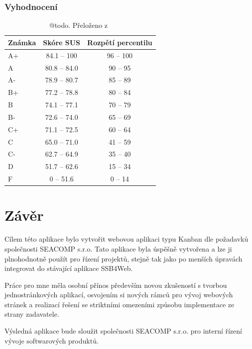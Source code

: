 \subsection{Vyhodnocení}

\begin{table}[hbt]
\centering
\caption{@todo. Přeloženo z~\cite{bib:sus-statistics}}
\begin{tabular}{|l|c|c|}
\hline
Známka & Skóre SUS  & Rozpětí percentilu  \\
\hline
A+    & 84.1 – 100  & 96 – 100          \\
A     & 80.8 – 84.0 & 90 – 95           \\
A-    & 78.9 – 80.7 & 85 – 89           \\
B+    & 77.2 – 78.8 & 80 – 84           \\
B     & 74.1 – 77.1 & 70 – 79           \\
B-    & 72.6 – 74.0 & 65 – 69           \\
C+    & 71.1 – 72.5 & 60 – 64           \\
C     & 65.0 – 71.0 & 41 – 59           \\
C-    & 62.7 – 64.9 & 35 – 40           \\
D     & 51.7 – 62.6 & 15 – 34           \\
F     & 0 – 51.6    & 0 – 14            \\
\hline
\end{tabular}
\end{table}

\chapter{Závěr}
Cílem této aplikace bylo vytvořit webovou aplikaci typu Kanban dle požadavků společnosti SEACOMP s.r.o. Tato aplikace byla úspěšně vytvořena a lze ji plnohodnotně použít pro řízení projektů, stejně tak jako po menších úpravách integrovat do stávající aplikace SSB4Web.

\blindtext

Práce pro mne měla osobní přínos především novou zkušeností s tvorbou jednostránkových aplikací, osvojením si nových rámců pro vývoj webových stránek a realizací řešení se striktními omezeními způsobu implementace ze strany zadavatele.

Výsledná aplikace bude sloužit společnosti SEACOMP s.r.o. pro interní řízení vývoje softwarových produktů.

